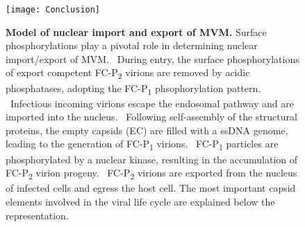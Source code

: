 \begin{figure}[H]
\centering
  \texttt{[image: Conclusion]}\\[0.2cm]
  \caption[Model of Nuclear Import and Export of MVM]
   {\textbf{Model of nuclear import and export of MVM.} Surface phosphorylations play a pivotal role in determining nuclear import/export of MVM. \textbf{}~During entry, the surface phosphorylations of export competent FC-P\textsubscript{2} virions are removed by acidic phosphatases, adopting the FC-P\textsubscript{1} phsophorylation pattern. \textbf{}~Infectious incoming virions escape the endosomal pathway and are imported into the nucleus. \textbf{}~Following self-assembly of the structural proteins, the empty capsids (EC) are filled with a ssDNA genome, leading to the generation of FC-P\textsubscript{1} virions. \textbf{}~FC-P\textsubscript{1} particles are phosphorylated by a nuclear kinase, resulting in the accumulation of FC-P\textsubscript{2} virion progeny. \textbf{}~FC-P\textsubscript{2} virions are exported from the nucleus of infected cells and egress the host cell. The most important capsid elements involved in the viral life cycle are explained below the representation.} 
\label{Scheme}
\end{figure}















